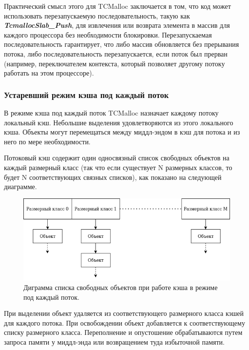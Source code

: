 Практический смысл этого для TCMalloc заключается в том, что код может использовать перезапускаемую последовательность, такую как \textbf{\textit{TcmallocSlab\_Push}}, для извлечения или возврата элемента в массив для каждого процессора без необходимости блокировки. Перезапускаемая последовательность гарантирует, что либо массив обновляется без прерывания потока, либо последовательность перезапускается, если поток был прерван (например, переключателем контекста, который позволяет другому потоку работать на этом процессоре).

\subsubsection{Устаревший режим кэша под каждый поток}

В режиме кэша под каждый поток TCMalloc назначает каждому потоку локальный кэш. Небольшие выделения удовлетворяются из этого локального кэша. Объекты могут перемещаться между миддл-эндом в кэш для потока и из него по мере необходимости.

Потоковый кэш содержит один односвязный список свободных объектов на каждый размерный класс (так что если существует N размерных классов, то будет N соответствующих связных списков), как показано на следующей диаграмме.

\begin{figure}[!h]
	\begin{center}
		\includegraphics[scale=0.6]{images/tcmalloc-per-thread.png}
		\caption{Диграмма списка свободных объектов при работе кэша в режиме под каждый поток.}
		\label{tcmalloc-per-thread}
	\end{center}
\end{figure}

При выделении объект удаляется из соответствующего размерного класса кэшей для каждого потока. При освобождении объект добавляется к соответствующему списку размерного класса. Переполнение и опустошение обрабатываются путем запроса памяти у миддл-энда или возвращением туда избыточной памяти.

